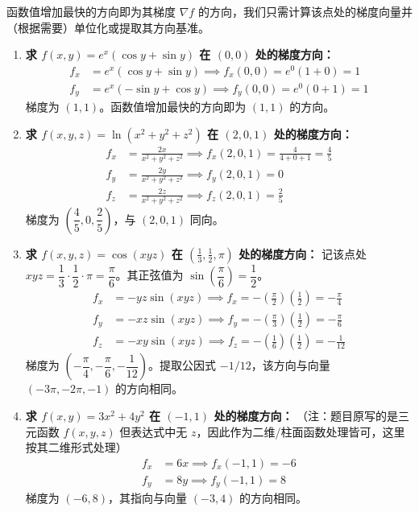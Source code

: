 \documentclass[lang=cn,11pt]{elegantbook}
\begin{document}
\begin{solution}
函数值增加最快的方向即为其梯度 $\nabla f$ 的方向，我们只需计算该点处的梯度向量并（根据需要）单位化或提取其方向基准。
\begin{enumerate}
  \item[(1)] \textbf{求 $f(x,y)=e^x(\cos y+\sin y)$ 在 $(0,0)$ 处的梯度方向：}
  \begin{align*}
  f_x &= e^x(\cos y+\sin y) \implies f_x(0,0) = e^0(1+0) = 1 \\
  f_y &= e^x(-\sin y+\cos y) \implies f_y(0,0) = e^0(0+1) = 1
  \end{align*}
  梯度为 $(1,1)$。函数值增加最快的方向即为 \textbf{$(1,1)$} 的方向。

  \item[(2)] \textbf{求 $f(x,y,z)=\ln(x^2+y^2+z^2)$ 在 $(2,0,1)$ 处的梯度方向：}
  \begin{align*}
  f_x &= \frac{2x}{x^2+y^2+z^2} \implies f_x(2,0,1) = \frac{4}{4+0+1} = \frac{4}{5} \\
  f_y &= \frac{2y}{x^2+y^2+z^2} \implies f_y(2,0,1) = 0 \\
  f_z &= \frac{2z}{x^2+y^2+z^2} \implies f_z(2,0,1) = \frac{2}{5}
  \end{align*}
  梯度为 $\left(\dfrac{4}{5}, 0, \dfrac{2}{5}\right)$，与 \textbf{$(2,0,1)$} 同向。

  \item[(3)] \textbf{求 $f(x,y,z)=\cos(xyz)$ 在 $\left(\frac{1}{3},\frac{1}{2},\pi\right)$ 处的梯度方向：}
  记该点处 $xyz = \dfrac{1}{3}\cdot\dfrac{1}{2}\cdot\pi = \dfrac{\pi}{6}$。其正弦值为 $\sin\left(\dfrac{\pi}{6}\right) = \dfrac{1}{2}$。
  \begin{align*}
  f_x &= -yz\sin(xyz) \implies f_x = -\left(\frac{\pi}{2}\right)\left(\frac{1}{2}\right) = -\frac{\pi}{4} \\
  f_y &= -xz\sin(xyz) \implies f_y = -\left(\frac{\pi}{3}\right)\left(\frac{1}{2}\right) = -\frac{\pi}{6} \\
  f_z &= -xy\sin(xyz) \implies f_z = -\left(\frac{1}{6}\right)\left(\frac{1}{2}\right) = -\frac{1}{12}
  \end{align*}
  梯度为 $\left(-\dfrac{\pi}{4}, -\dfrac{\pi}{6}, -\dfrac{1}{12}\right)$。提取公因式 $-1/12$，该方向与向量 \textbf{$(-3\pi, -2\pi, -1)$} 的方向相同。

  \item[(4)] \textbf{求 $f(x,y)=3x^2+4y^2$ 在 $(-1,1)$ 处的梯度方向：}
  （注：题目原写的是三元函数 $f(x,y,z)$ 但表达式中无 $z$，因此作为二维/柱面函数处理皆可，这里按其二维形式处理）
  \begin{align*}
  f_x &= 6x \implies f_x(-1,1) = -6 \\
  f_y &= 8y \implies f_y(-1,1) = 8
  \end{align*}
  梯度为 $(-6, 8)$，其指向与向量 \textbf{$(-3, 4)$} 的方向相同。
\end{enumerate}
\end{solution}
\end{document}
